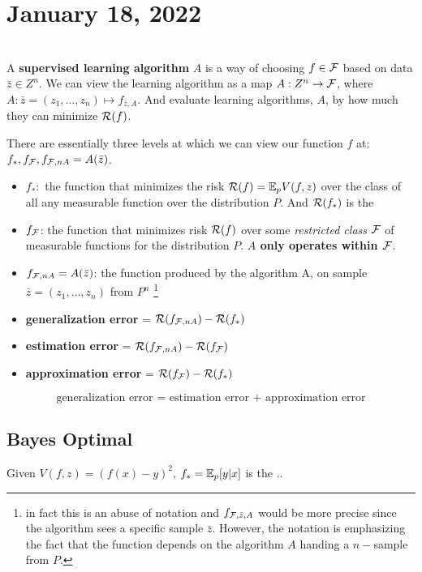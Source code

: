 \newpage
\section{January 18, 2022}
 \\
A \textbf{supervised learning algorithm} $A$ is a way of choosing $f \in \mathcal F$ based on data $\bar{z} \in Z^n$. We can view the learning algorithm as a map
$A: Z^n \to \mathcal F$, where $A: \bar{z} = (z_1, \dots, z_n) \mapsto f_{\bar{z}, A}$. And evaluate learning algorithms, $A$, by how much they can minimize $\mathcal R(f)$.
\begin{definition}
    There are essentially three levels at which we can view our function $f$ at: $f_*, f_{\mathcal F}, f_{\mathcal F,n A} = A(\bar{z})$.
    \begin{itemize}
        \item $f_*:$ the function that minimizes the risk $\mathcal R(f)= \mathbb E_{p}V(f,z)$ over the class of all any measurable  function over the distribution $P$. And $\mathcal R(f_{*})$ is the 

        \item $f_{\mathcal F}$: the function that minimizes risk $\mathcal R(f)$ over some \textit{restricted class} $\mathcal F$ of measurable functions for the distribution $P$. \textbf{$A$ only operates within $\mathcal F$}.

        \item $f_{\mathcal F,n A} = A(\bar{z})$: the function produced by the algorithm A, on sample $\bar{z} = (z_1, \dots, z_n)$ from $P^n$ \footnote{in fact this is an abuse of notation and $f_{\mathcal F,\bar{z}, A}$ would be more precise  since the algorithm sees a specific sample $\bar{z}$. However, the notation is emphasizing the fact that the function depends on the algorithm $A$ handing a $n-$sample from $P$.}
    \end{itemize}
\end{definition}
\begin{itemize}
    \item \textbf{generalization error} = $\mathcal R(f_{\mathcal F,n A}) - \mathcal R(f_*)$
    \item \textbf{estimation error} = $\mathcal R(f_{\mathcal F,n A}) - \mathcal R(f_\mathcal F)$
    \item \textbf{approximation error} = $\mathcal R(f_\mathcal F) - \mathcal R(f_*)$
    
\end{itemize}
$$
\text{generalization error = estimation error + approximation error}
$$
\subsection{Bayes Optimal}
\begin{proposition}
    Given $V(f,z) = (f(x) - y)^2$, $f_* = \mathbb E_p[y|x]$ is the ..
\end{proposition}